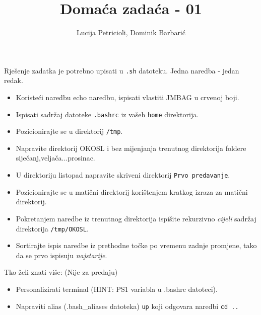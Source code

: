 \documentclass[12pt,a4paper]{article}
\newcommand{\shell}[1]{\texttt{#1}}
\begin{document}
	\title{Domaća zadaća - 01}
	\author{Lucija Petricioli, Dominik Barbarić}
	\maketitle
	Rješenje zadatka je potrebno upisati u \shell{.sh} datoteku. Jedna naredba - jedan redak.
	\begin{itemize}
    \item Koristeći naredbu echo naredbu, ispisati vlastiti JMBAG u crvenoj boji.
    \item Ispisati sadržaj datoteke \shell{.bashrc} iz vašeh \shell{home} direktorija.
		\item Pozicionirajte se u direktorij \shell{/tmp}.
		\item Napravite direktorij OKOSL i bez mijenjanja trenutnog direktorija foldere siječanj,veljača...prosinac.
		\item U direktoriju listopad napravite skriveni direktorij \shell{Prvo predavanje}.
		\item Pozicionirajte se u matični direktorij korištenjem kratkog izraza za matični direktorij.
		\item Pokretanjem naredbe iz trenutnog direktorija ispišite rekurzivno \textit{cijeli} sadržaj direktorija \shell{/tmp/OKOSL}.
		\item Sortirajte ispis naredbe iz prethodne točke po vremenu zadnje promjene, tako da se prvo ispisuju \textit{najstarije}.
	\end{itemize}
  Tko želi znati više: (Nije za predaju)
	\begin{itemize}
    \item Personalizirati terminal (HINT: PS1 variabla u .bashrc datoteci).
    \item Napraviti alias (.bash\_aliases datoteka) \shell{up} koji odgovara naredbi \shell{cd ..}
	\end{itemize}
\end{document}
